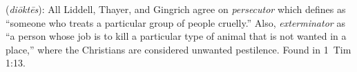 \item[Exterminator,]

(\textit{diōktēs}):
All Liddell, Thayer, and Gingrich agree on \emph{persecutor} which defines as ``someone who treats a particular group of people cruelly.'' Also, \emph{exterminator} as ``a person whose job is to kill a particular type of animal that is not wanted in a place,'' where the Christians are considered unwanted pestilence.
Found in 1~Tim 1:13.

